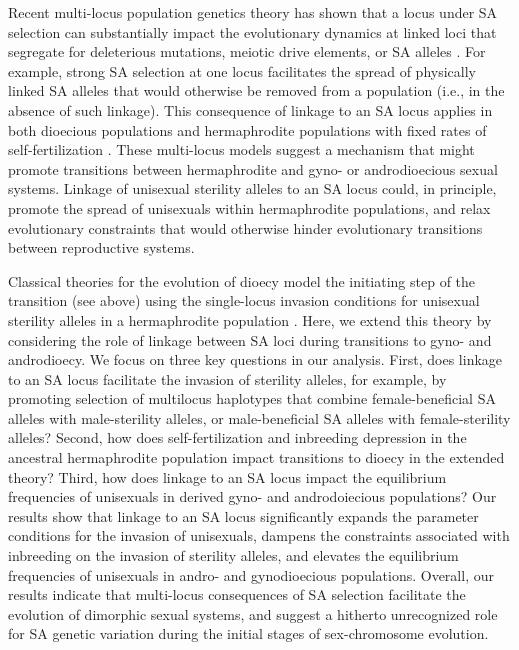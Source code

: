 \documentclass{article}
\begin{document}
Recent multi-locus population genetics theory has shown that a locus under SA selection can substantially impact the evolutionary dynamics at linked loci that segregate for deleterious mutations, meiotic drive elements, or SA alleles \citep{ConnallonClark2010, Patten2010, UbedaPatten2010, ConnallonJordan2016, Olito2016}. For example, strong SA selection at one locus facilitates the spread of physically linked SA alleles that would otherwise be removed from a population (i.e., in the absence of such linkage). This consequence of linkage to an SA locus applies in both dioecious populations \citep{Patten2010,ConnallonClark2010} and hermaphrodite populations with fixed rates of self-fertilization \citep{Olito2016}. These multi-locus models suggest a mechanism that might promote transitions between hermaphrodite and gyno- or androdioecious sexual systems. Linkage of unisexual sterility alleles to an SA locus could, in principle, promote the spread of unisexuals within hermaphrodite populations, and relax evolutionary constraints that would otherwise hinder evolutionary transitions between reproductive systems.

Classical theories for the evolution of dioecy model the initiating step of the transition (see above) using the single-locus invasion conditions for unisexual sterility alleles in a hermaphrodite population \citep{Charlesworth1978a}. Here, we extend this theory by considering the role of linkage between SA loci during transitions to gyno- and androdioecy. We focus on three key questions in our analysis. First, does linkage to an SA locus facilitate the invasion of sterility alleles, for example, by promoting selection of multilocus haplotypes that combine female-beneficial SA alleles with male-sterility alleles, or male-beneficial SA alleles with female-sterility alleles? Second, how does self-fertilization and inbreeding depression in the ancestral hermaphrodite population impact transitions to dioecy in the extended theory? Third, how does linkage to an SA locus impact the equilibrium frequencies of unisexuals in derived gyno- and androdoiecious populations? Our results show that linkage to an SA locus significantly expands the parameter conditions for the invasion of unisexuals, dampens the constraints associated with inbreeding on the invasion of sterility alleles, and elevates the equilibrium frequencies of unisexuals in andro- and gynodioecious populations. Overall, our results indicate that multi-locus consequences of SA selection facilitate the evolution of dimorphic sexual systems, and suggest a hitherto unrecognized role for SA genetic variation during the initial stages of sex-chromosome evolution.
\end{document}
